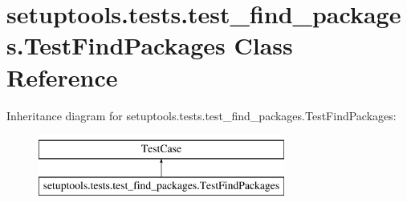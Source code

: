 \hypertarget{classsetuptools_1_1tests_1_1test__find__packages_1_1TestFindPackages}{}\section{setuptools.\+tests.\+test\+\_\+find\+\_\+packages.\+Test\+Find\+Packages Class Reference}
\label{classsetuptools_1_1tests_1_1test__find__packages_1_1TestFindPackages}
Inheritance diagram for setuptools.\+tests.\+test\+\_\+find\+\_\+packages.\+Test\+Find\+Packages\+:\begin{figure}[H]
\begin{center}
\leavevmode
\includegraphics[height=2.000000cm]{classsetuptools_1_1tests_1_1test__find__packages_1_1TestFindPackages}
\end{center}
\end{figure}
